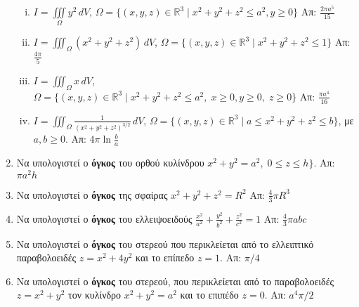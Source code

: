 \begin{enumerate}
    \begin{enumerate}[i)]
      \item $ I = \iiint\limits_{\Omega} y^{2} \,dV $, \quad $ \Omega = \{(x,y,z)\in 
        \mathbb{R}^{3} \mid x^{2}+y^{2}+z^{2} \leq a^{2}, y \geq 0 \} $ 
        \hfill Απ: $ \frac{2 \pi a^{5}}{15} $ 
      \item $ I= \iiint_{\Omega} (x^{2}+y^{2}+z^{2})\,dV $, \quad $ \Omega = 
        \{(x,y,z)\in \mathbb{R}^{3} \mid x^{2}+y^{2}+z^{2} \leq 1 \}$ 
        \hfill Απ: $ \frac{4 \pi}{5} $ 
      \item $ I=\iiint_{\Omega} x\,dV $, \quad $ \Omega = \{(x,y,z)\in \mathbb{R}^{3} 
        \mid x^{2}+y^{2}+z^{2} \leq a^{2},\; x \geq 0, y \geq 0,\; z \geq 0\} $ 
        \hfill Απ: $ \frac{\pi a^{4}}{16} $ 
      \item $ I = \iiint_{\Omega} \frac{1}{(x^{2}+y^{2}+z^{2})^{3/2}} \,dV$, \quad 
        $\Omega = \{ (x,y,z) \in \mathbb{R}^{3} \mid a \leq x^{2}+y^{2}+z^{2} \leq b \}$,
        με $ a,b \geq 0 $. \hfill Απ: $ 4 \pi \ln{\frac{b}{a}} $ 
    \end{enumerate}


  \item Να υπολογιστεί ο \textbf{όγκος} του ορθού κυλίνδρου $ x^{2}+y^{2} = a^{2},
  \; 0 \leq z \leq h \}  $.  \hfill Απ:  $ \pi a^{2} h $

  \item Να υπολογιστεί ο \textbf{όγκος} της σφαίρας $ x^{2}+y^{2}+z^{2} = R^{2} $
    \hfill Απ: $ \frac{4}{3} \pi R^{3} $ 

  \item Να υπολογιστεί ο \textbf{όγκος} του ελλειψοειδούς $ \frac{x^{2}}{a^{2}} +
    \frac{y^{2}}{b^{2}} + \frac{z^{2}}{c^{2}} =1 $ 
    \hfill Απ: $ \frac{4}{3} \pi abc $ 

  \item Να υπολογιστεί ο \textbf{όγκος} του στερεού που περικλείεται από το 
    ελλειπτικό παραβολοειδές $ z=x^{2}+4y^{2} $ και το επίπεδο $ z=1 $. 
    \hfill Απ: $ \pi /4 $ 

  \item Να υπολογιστεί ο \textbf{όγκος} του στερεού, που περικλείεται από 
    το παραβολοειδές $ z = x^{2}+y^{2} $ τον κυλίνδρο $ x^{2}+y^{2}=a^{2} $ και 
    το επιπέδο $ z = 0$.  
    \hfill Απ: $ a^{4} {\pi}/{2} $  


\end{enumerate}
